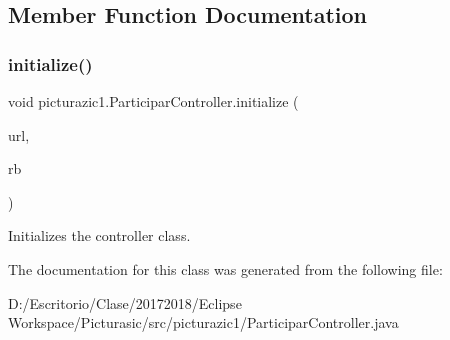 \subsection{Member Function Documentation}
\mbox{\label{classpicturazic1_1_1_participar_controller_a73c5f79e43aa45114e7bd176d3839dac}} 
\subsubsection{\texorpdfstring{initialize()}{initialize()}}
{\footnotesize\ttfamily void picturazic1.\+Participar\+Controller.\+initialize (\begin{DoxyParamCaption}\item[{U\+RL}]{url,  }\item[{Resource\+Bundle}]{rb }\end{DoxyParamCaption})}

Initializes the controller class. 

The documentation for this class was generated from the following file\+:\begin{DoxyCompactItemize}
\item 
D\+:/\+Escritorio/\+Clase/20172018/\+Eclipse Workspace/\+Picturasic/src/picturazic1/Participar\+Controller.\+java\end{DoxyCompactItemize}
